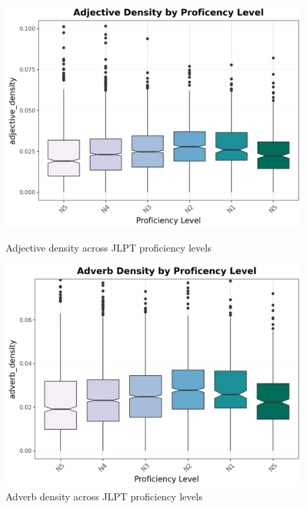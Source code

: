 \begin{figure}[htbp]
    \centering
    \begin{minipage}{.48\textwidth}
        \centering
    \includegraphics[scale=.4]{img/AdjDen}
    \caption[Adjective Density Across JLPT Proficiency Levels]{Adjective density across JLPT proficiency levels}
        \label{fig:adjDen}
    \end{minipage}
    \hfill
\begin{minipage}{.48\textwidth}
        \centering
        \includegraphics[scale=.4]{img/AdvDen}
        \caption[Adverb Density Across JLPT Proficiency Levels]{Adverb density across JLPT proficiency levels}
\label{fig:advDen}
\end{minipage}
    \end{figure}

